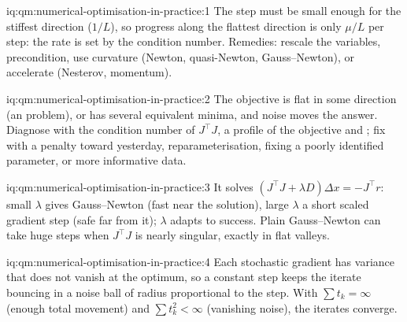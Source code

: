 \begin{solution}{iq:qm:numerical-optimisation-in-practice:1}
The step must be small enough for the stiffest direction ($1/L$), so progress along the flattest direction is only $\mu/L$ per step: the rate is set by the condition number. Remedies: rescale the
variables, precondition, use curvature (Newton, quasi-Newton, Gauss--Newton), or accelerate (Nesterov, momentum).
\end{solution}

\begin{solution}{iq:qm:numerical-optimisation-in-practice:2}
The objective is flat in some direction (an  problem), or has several equivalent minima, and noise moves the answer. Diagnose with the condition number of $J^\top J$, a profile of
the objective and ; fix with a penalty toward yesterday, reparameterisation, fixing a poorly identified parameter, or more informative data.
\end{solution}

\begin{solution}{iq:qm:numerical-optimisation-in-practice:3}
It solves $(J^\top J + \lambda D)\Delta x = -J^\top r$: small $\lambda$ gives Gauss--Newton (fast near the solution), large $\lambda$ a short scaled gradient step (safe far from it); $\lambda$ adapts to
success. Plain Gauss--Newton can take huge steps when $J^\top J$ is nearly singular, exactly in flat valleys.
\end{solution}

\begin{solution}{iq:qm:numerical-optimisation-in-practice:4}
Each stochastic gradient has variance that does not vanish at the optimum, so a constant step keeps the iterate bouncing in a noise ball of radius proportional to the step. With $\sum t_k = \infty$
(enough total movement) and $\sum t_k^2 < \infty$ (vanishing noise), the iterates converge.
\end{solution}

